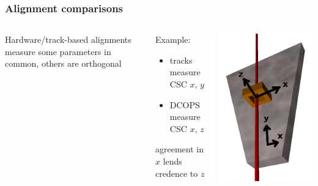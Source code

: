\documentclass[compress]{beamer}
\begin{document}
\begin{frame}
\frametitle{Alignment comparisons}

\begin{columns}
Hardware/track-based alignments measure some parameters in common, others are orthogonal

\begin{center}
\begin{minipage}{0.8\linewidth}
Example:
\begin{itemize}
\item tracks measure CSC $x$, $y$
\item DCOPS measure CSC $x$, $z$
\end{itemize}

agreement in $x$ lends credence to $z$
\end{minipage}
\end{center}

\includegraphics[width=\linewidth]{comparison.png}
\end{columns}


\end{frame}
\end{document}
